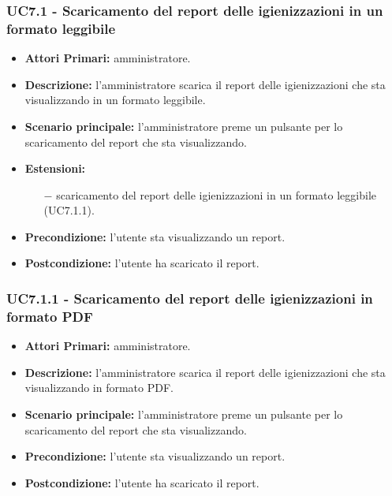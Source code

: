 \subsubsection{ UC7.1 - Scaricamento del report delle igienizzazioni in un formato leggibile}
\begin{itemize}
	\item\textbf{Attori Primari:} 
	amministratore.
	\item\textbf{Descrizione:} 
	l'amministratore scarica il report delle igienizzazioni che sta visualizzando in un formato leggibile.
	\item\textbf{Scenario principale:} 
	l'amministratore preme un pulsante per lo scaricamento del report che sta visualizzando.
	\item\textbf{Estensioni:}
	\begin{itemize}
		\item[$-$] scaricamento del report delle igienizzazioni in un formato leggibile (UC7.1.1).
	\end{itemize}
	\item\textbf{Precondizione:} 
	l'utente sta visualizzando un report.
	\item\textbf{Postcondizione:}
	l'utente ha scaricato il report.
\end{itemize}

\subsubsection{ UC7.1.1 - Scaricamento del report delle igienizzazioni in formato PDF}
\begin{itemize}
	\item\textbf{Attori Primari:} 
	amministratore.
	\item\textbf{Descrizione:} 
	l'amministratore scarica il report delle igienizzazioni che sta visualizzando in formato PDF.
	\item\textbf{Scenario principale:} 
	l'amministratore preme un pulsante per lo scaricamento del report che sta visualizzando.
	\item\textbf{Precondizione:} 
	l'utente sta visualizzando un report.
	\item\textbf{Postcondizione:}
	l'utente ha scaricato il report.
\end{itemize}





